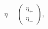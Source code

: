 \begin{equation}
\eta=\left( \begin{array}{c} \eta_+ \\ \eta_- \end{array} \right),
\label{spinorcom}
\end{equation}

